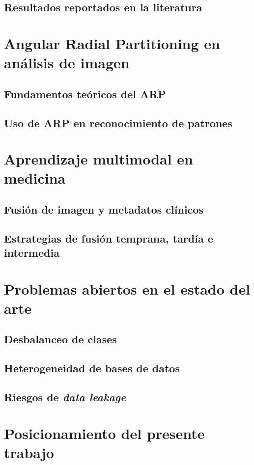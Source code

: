 \subsection{Resultados reportados en la literatura}
\section{Angular Radial Partitioning en análisis de imagen}
\subsection{Fundamentos teóricos del ARP}
\subsection{Uso de ARP en reconocimiento de patrones}
\section{Aprendizaje multimodal en medicina}
\subsection{Fusión de imagen y metadatos clínicos}
\subsection{Estrategias de fusión temprana, tardía e intermedia}
\section{Problemas abiertos en el estado del arte}
\subsection{Desbalanceo de clases}
\subsection{Heterogeneidad de bases de datos}
\subsection{Riesgos de \textit{data leakage}}
\section{Posicionamiento del presente trabajo}